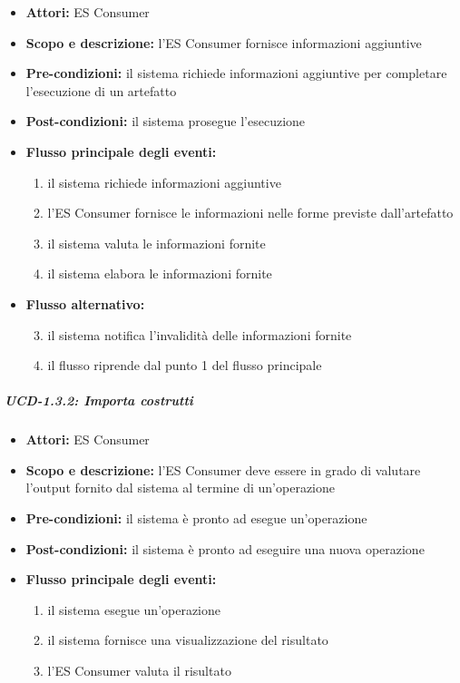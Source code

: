 \begin{itemize}
	\item \textbf{Attori:} ES Consumer
	\item \textbf{Scopo e descrizione:} l'ES Consumer fornisce informazioni aggiuntive 
	\item \textbf{Pre-condizioni:} il sistema richiede informazioni aggiuntive per completare l'esecuzione di un artefatto
	\item \textbf{Post-condizioni:} il sistema prosegue l'esecuzione
	\item \textbf{Flusso principale degli eventi:}
		\begin{enumerate}
			\item il sistema richiede informazioni aggiuntive
			\item l'ES Consumer fornisce le informazioni nelle forme previste dall'artefatto
			\item il sistema valuta le informazioni fornite
			\item il sistema elabora le informazioni fornite
		\end{enumerate}
	\item \textbf{Flusso alternativo:} 
		\begin{enumerate}
			\setcounter{enumi}{2}
			\item il sistema notifica l'invalidità delle informazioni fornite
			\item il flusso riprende dal punto 1 del flusso principale
		\end{enumerate}
\end{itemize}


\subparagraph{UCD-1.3.2: Importa costrutti}

\begin{itemize}
	\item \textbf{Attori:} ES Consumer
	\item \textbf{Scopo e descrizione:} l'ES Consumer deve essere in grado di valutare l'output fornito dal sistema al termine di un'operazione
	\item \textbf{Pre-condizioni:} il sistema è pronto ad esegue un'operazione
	\item \textbf{Post-condizioni:} il sistema è pronto ad eseguire una nuova operazione
	\item \textbf{Flusso principale degli eventi:}
		\begin{enumerate}
			\item il sistema esegue un'operazione
			\item il sistema fornisce una visualizzazione del risultato
			\item l'ES Consumer valuta il risultato
		\end{enumerate}
\end{itemize}



